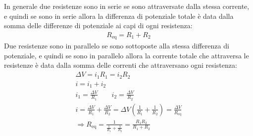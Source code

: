 \documentclass[a4paper, oneside]{article}
\begin{document}
    \noindent
    In generale due resistenze sono in serie se sono attraversate dalla stessa corrente, e quindi se sono in serie allora la differenza di potenziale totale è data dalla somma delle differenze di potenziale ai capi di ogni resistenza:
    \begin{gather*}
        R_\text{eq} = R_1 + R_2
    \end{gather*}
    Due resistenze sono in parallelo se sono sottoposte alla stessa differenza di potenziale, e quindi se sono in parallelo allora la corrente totale che attraversa le resistenze è data dalla somma delle correnti che attraversano ogni resistenza:
    \begin{gather*}
        \Delta V = i_1 R_1 = i_2 R_2\\
        i = i_1 + i_2 \\
        i_1 = \frac{\Delta V}{R_1} \qquad i_2 = \frac{\Delta V}{R_2} \\
        i = \frac{\Delta V}{R_1} + \frac{\Delta V}{R_2} = \Delta V \left( \frac{1}{R_1} + \frac{1}{R_2} \right) = \frac{\Delta V}{R_\text{eq}} \\
        \Rightarrow R_\text{eq} = \frac{1}{\frac{1}{R_1} + \frac{1}{R_2}} = \frac{R_1 R_2}{R_1 + R_2}
    \end{gather*}
    \newpage
\end{document}
